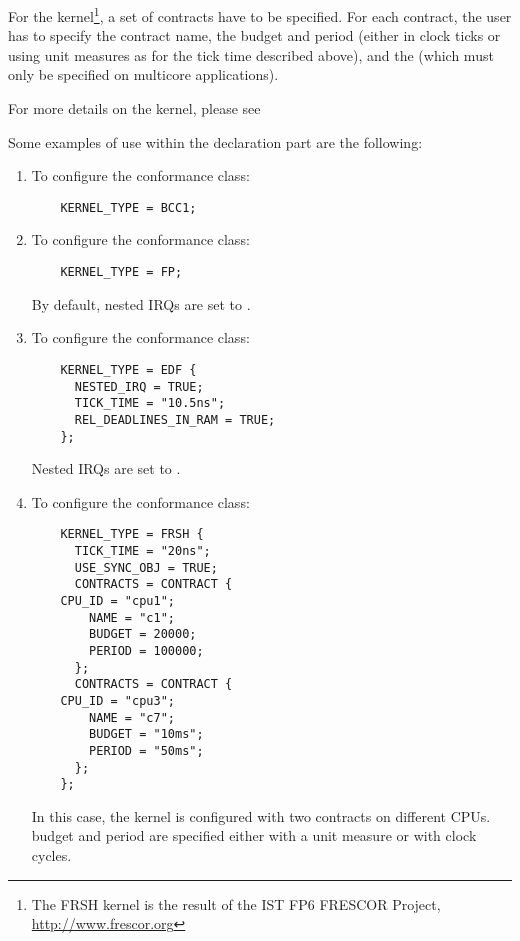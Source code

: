 For the  kernel\footnote{The FRSH kernel is the result of
the IST FP6 FRESCOR Project, \url{http://www.frescor.org}}, a set of
contracts have to be specified. For each contract, the user has to
specify the contract name, the budget and period (either in clock
ticks or using unit measures as for the tick time described above),
and the  (which must only be specified on multicore
applications).

For more details on the  kernel, please see

Some examples of use within the declaration part are the following:

\begin{enumerate}

\item
  To configure the  conformance class:
  \begin{lstlisting}
    KERNEL_TYPE = BCC1;
  \end{lstlisting}
  
\item
  To configure the  conformance class: 
  
  \begin{lstlisting}
    KERNEL_TYPE = FP;
  \end{lstlisting}
  
  By default, nested IRQs are set to .
  
\item
  To configure the  conformance class:
  
  \begin{lstlisting}
    KERNEL_TYPE = EDF { 
      NESTED_IRQ = TRUE; 
      TICK_TIME = "10.5ns"; 
      REL_DEADLINES_IN_RAM = TRUE;
    };
  \end{lstlisting}
  
  Nested IRQs are set to .

\item
  To configure the  conformance class:
  
  \begin{lstlisting}
    KERNEL_TYPE = FRSH {
      TICK_TIME = "20ns";
      USE_SYNC_OBJ = TRUE;
      CONTRACTS = CONTRACT {
	CPU_ID = "cpu1";
        NAME = "c1";
        BUDGET = 20000;
        PERIOD = 100000;
      };
      CONTRACTS = CONTRACT {
	CPU_ID = "cpu3";
        NAME = "c7";
        BUDGET = "10ms";
        PERIOD = "50ms";
      };
    };
  \end{lstlisting}

  In this case, the  kernel is configured with two
  contracts on different CPUs. budget and period are specified either
  with a unit measure or with clock cycles.
  
\end{enumerate}



